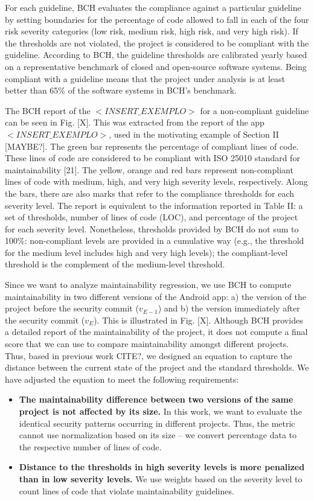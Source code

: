 \documentclass[10pt,conference]{IEEEtran}
\begin{document}
For each guideline, BCH evaluates the compliance against a particular guideline by setting boundaries for the percentage of code allowed to fall in each of the four risk severity categories (low risk, medium risk, high risk, and very high risk). If the thresholds are not violated, the project is considered to be compliant with the guideline. According to BCH, the guideline thresholds are calibrated yearly based on a representative benchmark of closed and open-source software systems. Being compliant with a guideline means that the project under analysis is at least better than 65\% of the software systems in BCH’s benchmark.

The BCH report of the $<INSERT\_EXEMPLO>$ for a non-compliant guideline can be seen in Fig. [X]. This was extracted from the report of the app $<INSERT\_EXEMPLO>$, used in the motivating example of Section II [MAYBE?]. The green bar represents the percentage of compliant lines of code. These lines of code are considered to be compliant with ISO 25010 standard for maintainability [21]. The yellow, orange and red bars represent non-compliant lines of code with medium, high, and very high severity levels, respectively. Along the bars, there are also marks that refer to the compliance thresholds for each severity level. The report is equivalent to the information reported in Table II: a set of thresholds, number of lines of code (LOC), and percentage of the project for each severity level. Nonetheless, thresholds provided by BCH do not sum to 100\%: non-compliant levels are provided in a cumulative way (e.g., the threshold for the medium level includes high and very high levels); the compliant-level threshold is the complement of the medium-level threshold.

Since we want to analyze maintainability regression, we
use BCH to compute maintainability in two different versions of the Android app: a) the version of the project before the security commit ($v_{E−1}$) and b) the version immediately after the security commit ($v_E$). This is illustrated in Fig. [X].
Although BCH provides a detailed report of the maintainability of the project, it does not compute a final score that we can use to compare maintainability amongst different projects. Thus, based in previous work CITE?, we designed an equation to capture the distance between the current state of the project and the standard thresholds. We have adjusted the equation to meet the following requirements:

\begin{itemize}
	\item \textbf{The maintainability difference between two versions of the same project is not affected by its size.} In this work, we want to evaluate the identical security patterns occurring in different projects. Thus, the metric cannot use normalization based on its size – we convert percentage data to the respective number of lines of code.
	\item \textbf{Distance to the thresholds in high severity levels is more penalized than in low severity levels.} We use weights based on the severity level to count lines of code that violate maintainability guidelines.
\end{itemize}
\end{document}
